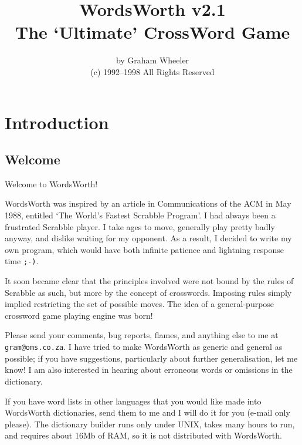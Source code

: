 

\title{WordsWorth v2.1\\The `Ultimate' CrossWord Game}
\author{by Graham Wheeler\\(c) 1992--1998  All Rights Reserved}
\maketitle
\tableofcontents

\section{Introduction}

\subsection{Welcome}

Welcome to WordsWorth!

WordsWorth was inspired by an article in Communications of the ACM in
May 1988, entitled `The World's Fastest Scrabble Program'.  I had
always been a frustrated Scrabble player. I take ages to move,
generally play pretty badly anyway, and dislike waiting for my
opponent. As a result, I decided to write my own program, which would
have both infinite patience and lightning response time {\tt ;-)}. 

It soon became clear that the principles involved were not bound by
the rules of Scrabble as such, but more by the concept of crosswords.
Imposing rules simply implied restricting the set of possible moves.
The idea of a general-purpose crossword game playing engine was born!

Please send your comments, bug reports, flames, and anything else to
me at {\tt gram@oms.co.za}.  I have tried to make WordsWorth
as generic and general as possible; if you have suggestions,
particularly about further generalisation, let me know! I am also
interested in hearing about erroneous words or omissions in the
dictionary.

If you have word lists in other languages that you would like made
into WordsWorth dictionaries, send them to me and I will do it for
you (e-mail only please). The dictionary builder runs only under
UNIX, takes many hours to run, and requires about 16Mb of RAM, so it
is not distributed with WordsWorth.

